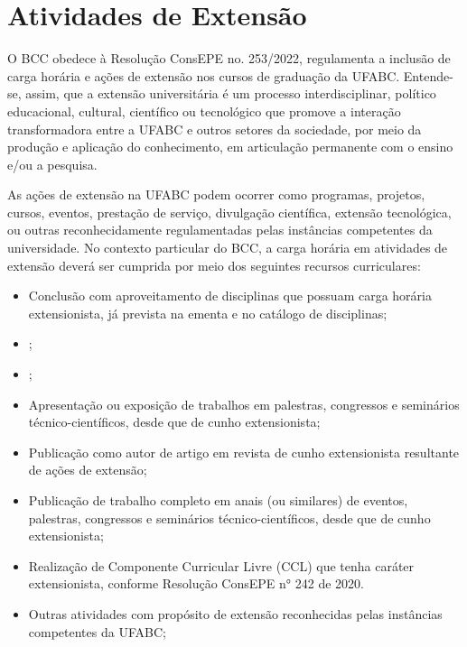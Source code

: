 \section{Atividades de Extensão}
\label{sec:extensao}

O BCC obedece à Resolução ConsEPE no. 253/2022, regulamenta a inclusão de carga horária e ações de extensão nos cursos de graduação da UFABC. Entende-se, assim, que a extensão universitária é um processo interdisciplinar, político educacional, cultural, científico ou tecnológico que promove a interação transformadora entre a UFABC e outros setores da sociedade, por meio da produção e aplicação do conhecimento, em articulação permanente com o ensino e/ou a pesquisa.

As ações de extensão na UFABC podem ocorrer como programas, projetos, cursos, eventos, prestação de serviço, divulgação científica, extensão tecnológica, ou outras reconhecidamente regulamentadas pelas instâncias competentes da universidade. 
No contexto particular do BCC, a carga horária em atividades de extensão deverá ser cumprida por meio dos seguintes recursos curriculares:
\begin{itemize}
	\item Conclusão com aproveitamento de disciplinas que possuam carga horária extensionista, já prevista na ementa e no catálogo de disciplinas;
	\item {}; 
	\item {};
	\item Apresentação ou exposição de trabalhos em palestras, congressos e	seminários técnico-científicos, desde que de cunho extensionista;
	\item Publicação como autor de artigo em revista de cunho extensionista resultante de ações de extensão;
	\item Publicação de trabalho completo em anais (ou similares) de eventos, palestras, congressos e seminários técnico-científicos, desde que de cunho extensionista;
	\item Realização de Componente Curricular Livre (CCL) que tenha caráter extensionista, conforme Resolução ConsEPE n° 242 de 2020.
	\item Outras atividades com propósito de extensão reconhecidas pelas instâncias competentes da UFABC;
\end{itemize}

